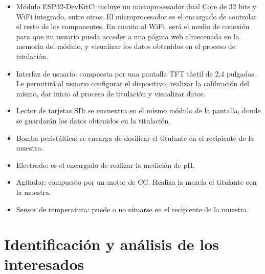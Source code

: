 \documentclass[11pt]{charter}
\begin{document}
\begin{itemize}
\item Módulo ESP32-DevKitC: incluye un microprocesador dual Core de 32 bits y WiFi integrado, entre otros. El microprocesador es el encargado de controlar el resto de los componentes. En cuanto al WiFi, será el medio de conexión para que un usuario pueda acceder a una página web almecenada en la memoria del módulo, y visualizar los datos obtenidos en el proceso de titulación.
\item Interfaz de usuario: compuesta por una pantalla TFT táctil de 2,4 pulgadas. Le permitirá al usuario configurar el dispositivo, realizar la calibración del mismo, dar inicio al proceso de titulación y visualizar datos.
\item Lector de tarjetas SD: se encuentra en el mismo módulo de la pantalla, donde se guardarán los datos obtenidos en la titulación.
\item Bomba peristáltica: se encarga de dosificar el titulante en el recipiente de la muestra.
\item Electrodo: es el encargado de realizar la medición de pH.
\item Agitador: compuesto por un motor de CC. Realiza la mezcla el titulante con la muestra.
\item Sensor de temperatura: puede o no situarse en el recipiente de la muestra.
\end{itemize}








\section{Identificación y análisis de los interesados}
\label{sec:interesados}

 
 

\end{document}
